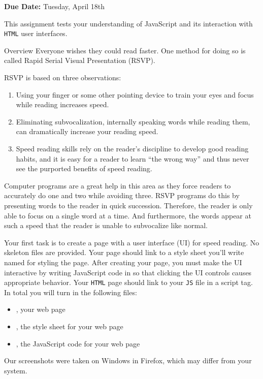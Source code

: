 \documentclass[programming]{../../mfcs}
\newcommand{\projectduedate}{Tuesday, April 18th}
\begin{document}
\vspace{-3.8em}

\hfill\begin{varwidth}{0.5\textwidth}
{\large {\bf\color{colour} Due Date:} \projectduedate}
\end{varwidth}
\vspace{1em}

This assignment tests your understanding of JavaScript and its interaction with \texttt{HTML} user interfaces.
\newline

\begin{question}{Overview}
Everyone wishes they could read faster. One method for doing so is called Rapid Serial Visual Presentation (RSVP).
\newline

RSVP is based on three observations:
\begin{enumerate}[{1.}]
  \item Using your finger or some other pointing device to train your eyes and focus while reading increases speed.
  \item Eliminating subvocalization, internally speaking words while reading them, can dramatically increase your
reading speed.
  \item Speed reading skills rely on the reader’s discipline to develop good reading habits, and it is easy for a reader
to learn ``the wrong way'' and thus never see the purported benefits of speed reading.
\end{enumerate}

Computer programs are a great help in this area as they force readers to accurately do one and two while avoiding three. RSVP programs do
this by presenting words to the reader in quick succession. Therefore, the reader is only able to focus on a single word at a time. And 
furthermore, the words appear at such a speed that the reader is 
unable to subvocalize like normal.
\newline

Your first task is to create a page \texttt{\textbf{\color{colour}{speedreader.html}}} with a user interface (UI) for speed reading. No skeleton files are provided. Your page should link to a style sheet you'll
write named \texttt{\textbf{\color{colour}{speedreader.css}}} for styling the page. After creating your 
page, you must make the UI interactive by writing JavaScript code in
\texttt{\textbf{\color{colour}{speedreader.js}}} so that clicking the
UI controls causes appropriate behavior. Your \texttt{HTML} page should link to your \texttt{JS} file in a script tag.
In total you will turn in the following files:
\begin{itemize}
  \item \texttt{\textbf{\color{colour}{speedreader.html}}}, your web page
  \item \texttt{\textbf{\color{colour}{speedreader.css}}}, the style sheet for your web page
  \item \texttt{\textbf{\color{colour}{speedreader.js}}}, the JavaScript code for your web page
\end{itemize}
Our screenshots were taken on Windows in Firefox, which may differ from your system.
\end{question}
\end{document}
